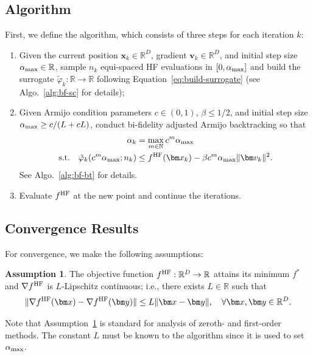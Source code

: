 \documentclass[10pt]{article} %
\numberwithin{equation}{section}
\theoremstyle{plain}
\theoremstyle{definition}
\newtheorem{assumption}[theorem]{Assumption}
\newcommand{\<}{\langle}
\renewcommand{\>}{\rangle}
\renewcommand{\(}{\left(}
\renewcommand{\)}{\right)}
\renewcommand{\[}{\left[}
\renewcommand{\]}{\right]}
\def\R{{\mathbb R}}
\def\R{{\mathbb R}}
\newcommand{\HF}{\textup{HF}}
\newcommand{\alphaMax}{\alpha_\textup{max}}
\newcommand{\Lip}{L}
\newcommand{\HFSurrogate}{\tilde{\varphi}_k}
\begin{document}

\subsection{Algorithm}
\label{ssec:algorithm}

\noindent First, we define the algorithm, which consists of three steps for each iteration $k$:
\begin{enumerate}
    \item Given the current position $\bm x_k\in\R^D$, gradient $\bm v_k\in\R^D$, and initial step size $\alphaMax\in\R$, sample $n_k$ equi-spaced HF evaluations in $[0, \alphaMax]$ and build the surrogate $\HFSurrogate:\R\to\R$ following Equation~\eqref{eq:build-surrogate} (see Algo.~\ref{alg:bf-sc} for details);
    \item Given Armijo condition parameters $c\in(0, 1)$, $\beta\leq 1/2$, and initial step size $\alphaMax\geq c/(\Lip + c\Lip)$, conduct bi-fidelity adjusted Armijo backtracking so that 
    \begin{equation}
    \label{eq:adjusted-armijo-new}
    \begin{aligned}
        \alpha_k &= \max_{m \in \mathbb{N}} c^m \alphaMax \\
        \text{s.t.}\quad \HFSurrogate(c^m \alphaMax; n_k) &\leq f^\HF(\bm x_k) - \beta c^m \alphaMax \lVert \bm v_k \rVert^2.
    \end{aligned}
    \end{equation}
    See Algo.~\ref{alg:bf-bt} for details.
    \item Evaluate $f^\HF$ at the new point and continue the iterations.
\end{enumerate}

\subsection{Convergence Results}
\label{ssec:convergence}

\noindent For convergence, we make the following assumptions:

\begin{assumption}
\label{asp:lambda-smooth}
    The objective function $f^\HF:\R^D\to\R$ attains its minimum $f^\ast$ and $\nabla f^\HF$ is $\Lip$-Lipschitz continuous; i.e., there exists $\Lip\in\R$ such that
    \begin{equation}
        \lVert \nabla f^\HF(\bm x) - \nabla f^\HF(\bm y)\rVert \leq \Lip \lVert \bm x - \bm y\rVert, \quad  \forall \bm x, \bm y\in\R^D.
    \end{equation}
\end{assumption}
Note that Assumption~\ref{asp:lambda-smooth} is standard for analysis of zeroth- and first-order methods. The constant $L$ must be known to the algorithm since it is used to set $\alphaMax$.
\end{document}
